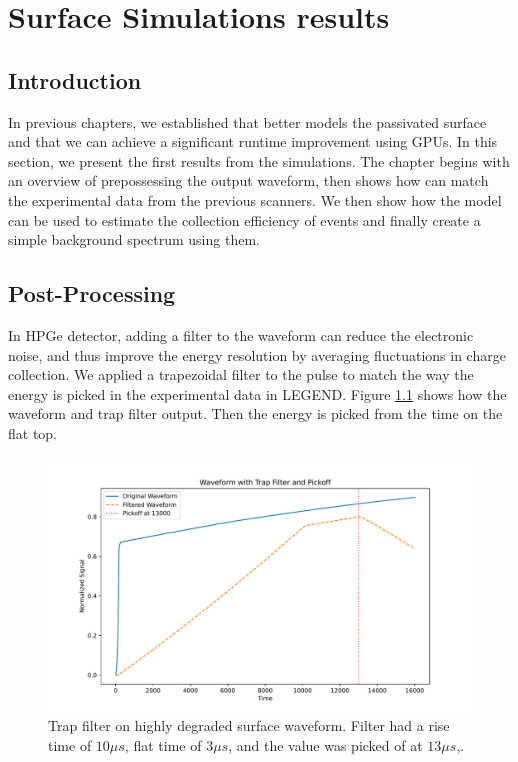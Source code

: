 \chapter{Surface Simulations results}
\label{chap:ehd_res}

\section{Introduction}
In previous chapters, we established that {\ehd} better models the passivated surface and that we can achieve a significant runtime improvement using GPUs. In this section, we present the first results from the simulations. The chapter begins with an overview of prepossessing the output waveform, then shows how {\ehd} can match the experimental data from the previous scanners. We then show how the model can be used to estimate the collection efficiency of {\onbb} events and finally create a simple background spectrum using them.

\section{Post-Processing}

In HPGe detector, adding a filter to the waveform can reduce the electronic noise, and thus improve the energy resolution by averaging fluctuations in charge collection. We applied a trapezoidal filter to the pulse to match the way the energy is picked in the experimental data in LEGEND. Figure \ref{ch5_fig_trap_filter} shows how the waveform and trap filter output. Then the energy is picked from the time on the flat top.

\begin{figure}%
\centering
\includegraphics[trim={0cm 0cm 0cm 0cm},clip,width=0.9\linewidth]{ch5/figs/trap_filt.pdf}
\caption{Trap filter on highly degraded surface waveform. Filter had a rise time of $10 \mu s$, flat time of $3 \mu s$, and the value was picked of at $13 \mu s$,.}
\label{ch5_fig_trap_filter}
\end{figure}

